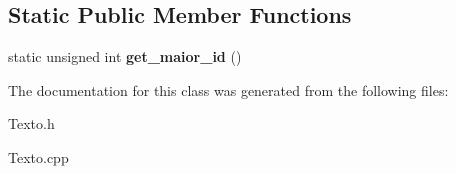 \subsection*{Static Public Member Functions}
\begin{DoxyCompactItemize}
\item 
\hypertarget{class_texto_a674eed23fb437d4f07634f9d6559d325}{static unsigned int {\bfseries get\-\_\-maior\-\_\-id} ()}\label{class_texto_a674eed23fb437d4f07634f9d6559d325}

\end{DoxyCompactItemize}


The documentation for this class was generated from the following files\-:\begin{DoxyCompactItemize}
\item 
Texto.\-h\item 
Texto.\-cpp\end{DoxyCompactItemize}
